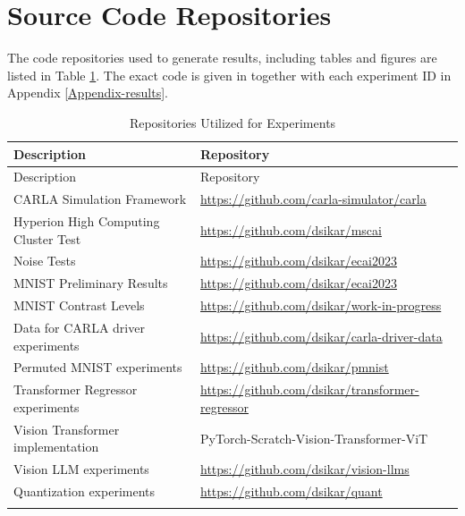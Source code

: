
\section{Source Code Repositories}
The code repositories used to generate results, including tables and figures are listed in Table \ref{tab:thesis_repositories}.
The exact code is given in together with each experiment ID in Appendix \ref{Appendix-results}.

\begin{longtable}{@{}ll@{}}
\toprule
Description & Repository \\
\midrule
\endfirsthead
\toprule
Description & Repository \\
\midrule
\endhead
CARLA Simulation Framework & \url{https://github.com/carla-simulator/carla} \\
Hyperion High Computing Cluster Test & \url{https://github.com/dsikar/mscai} \\
Noise Tests & \url{https://github.com/dsikar/ecai2023} \\
MNIST Preliminary Results & \url{https://github.com/dsikar/ecai2023} \\
MNIST Contrast Levels & \url{https://github.com/dsikar/work-in-progress} \\
Data for CARLA driver experiments & \url{https://github.com/dsikar/carla-driver-data} \\
Permuted MNIST experiments & \url{https://github.com/dsikar/pmnist} \\
Transformer Regressor experiments & \url{https://github.com/dsikar/transformer-regressor} \\
Vision Transformer implementation & PyTorch-Scratch-Vision-Transformer-ViT \\
Vision LLM experiments & \url{https://github.com/dsikar/vision-llms} \\
Quantization experiments & \url{https://github.com/dsikar/quant} \\
\bottomrule
\caption{Repositories Utilized for Experiments}
\label{tab:thesis_repositories}
\end{longtable}


